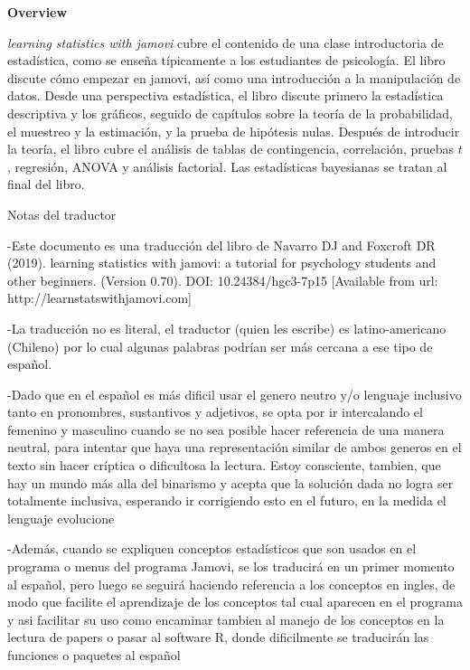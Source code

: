 

\clearpage
\newpage
\begin{center}
{\bf Overview}
\end{center}

\noindent
{\it learning statistics with jamovi} cubre el contenido de una clase introductoria de estadística, como se enseña típicamente a los estudiantes de psicología. El libro discute cómo empezar en jamovi, así como una introducción a la manipulación de datos. Desde una perspectiva estadística, el libro discute primero la estadística descriptiva y los gráficos, seguido de capítulos sobre la teoría de la probabilidad, el muestreo y la estimación, y la prueba de hipótesis nulas. Después de introducir la teoría, el libro cubre el análisis de tablas de contingencia, correlación, pruebas $t$, regresión, ANOVA y análisis factorial. Las estadísticas bayesianas se tratan al final del libro.

Notas del traductor

-Este documento es una traducción del libro de Navarro DJ and Foxcroft DR (2019). learning statistics with jamovi: a tutorial for psychology students and other beginners. (Version 0.70). DOI: 10.24384/hgc3-7p15 [Available from url: http://learnstatswithjamovi.com]

-La traducción no es literal,  el traductor (quien les escribe) es latino-americano (Chileno) por lo cual algunas palabras podrían ser más cercana a ese tipo de español.

-Dado que en el español es más dificil usar el genero neutro y/o lenguaje inclusivo tanto en pronombres, sustantivos y adjetivos, se opta por ir intercalando el femenino y masculino cuando se no sea posible hacer referencia de una manera neutral, para intentar que haya una representación similar de ambos generos en el texto sin hacer críptica o dificultosa la lectura. Estoy consciente, tambien, que hay un mundo más alla del binarismo y acepta que la solución dada no logra ser totalmente inclusiva, esperando ir corrigiendo esto en el futuro, en la medida el lenguaje evolucione

-Además, cuando se expliquen conceptos estadísticos que son usados en el programa o menus del programa Jamovi, se los traducirá en un primer momento al español,  pero luego se seguirá haciendo referencia a los conceptos en ingles, de modo que facilite el aprendizaje de los conceptos tal cual aparecen en el programa y asi facilitar su uso como encaminar tambien al manejo de los conceptos en la lectura de papers o pasar al software R, donde dificilmente se traducirán las funciones o paquetes al español


